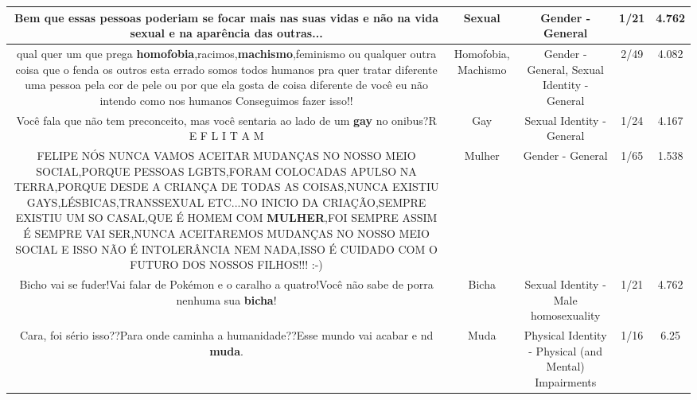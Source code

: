 \documentclass[11pt]{article}
\newlength\mylength
\begin{document}
\begin{center}
\begin{longtable}{|C{.65\mylength}|C{.30\mylength}|C{.12\mylength}|C{.12\mylength}|C{.12\mylength}|}
  \small Bem que essas pessoas poderiam se focar mais nas suas vidas e não na vida \textbf{sexual} e na aparência das outras...\normalsize   & Sexual & Gender - General & 1/21 & 4.762 \\  \hline
  \small qual quer um que prega \textbf{homofobia},racimos,\textbf{machismo},feminismo ou qualquer outra coisa que o fenda os outros esta errado somos todos humanos pra quer tratar diferente  uma pessoa pela cor de pele ou por que ela gosta de coisa diferente de você eu não intendo como nos humanos Conseguimos fazer isso!!\normalsize   & Homofobia, Machismo & Gender - General, Sexual Identity - General & 2/49 & 4.082 \\  \hline
  \small Você fala que não tem preconceito, mas você sentaria ao lado de um \textbf{gay} no onibus?R E F L I T A M\normalsize   & Gay & Sexual Identity - General & 1/24 & 4.167 \\  \hline
  \small FELIPE NÓS NUNCA VAMOS ACEITAR MUDANÇAS NO NOSSO MEIO SOCIAL,PORQUE PESSOAS LGBTS,FORAM COLOCADAS APULSO NA TERRA,PORQUE DESDE A CRIANÇA DE TODAS AS COISAS,NUNCA EXISTIU GAYS,LÉSBICAS,TRANSSEXUAL ETC...NO INICIO DA CRIAÇÃO,SEMPRE EXISTIU UM SO CASAL,QUE É HOMEM COM \textbf{MULHER},FOI SEMPRE ASSIM É SEMPRE VAI SER,NUNCA ACEITAREMOS MUDANÇAS NO NOSSO MEIO SOCIAL E ISSO NÃO É INTOLERÂNCIA NEM NADA,ISSO É CUIDADO COM O FUTURO DOS NOSSOS FILHOS!!! :-)\normalsize   & Mulher & Gender - General & 1/65 & 1.538 \\  \hline
  \small Bicho vai se fuder!Vai falar de Pokémon e o caralho a quatro!Você não sabe de porra nenhuma sua \textbf{bicha}!\normalsize   & Bicha & Sexual Identity - Male homosexuality & 1/21 & 4.762 \\  \hline
  \small Cara, foi sério isso??Para onde caminha a humanidade??Esse mundo vai acabar e nd \textbf{muda}.\normalsize   & Muda & Physical Identity - Physical (and Mental) Impairments & 1/16 & 6.25 \\  \hline

\end{longtable}
\end{center}
\end{document}

